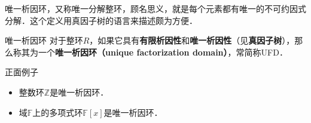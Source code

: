 


唯一析因环，又称唯一分解整环，顾名思义，就是每个元素都有唯一的不可约因式分解．这个定义用真因子树的语言来描述颇为方便．

\begin{definition}{唯一析因环}
对于整环$R$，如果它具有\textbf{有限析因性}和\textbf{唯一析因性}（见\textbf{真因子树}），那么称其为一个\textbf{唯一析因环（unique factorization domain）}，常简称UFD．
\end{definition}

\begin{example}{正面例子}
\begin{itemize}
\item 整数环$\mathbb{Z}$是唯一析因环．
\item 域$\mathbb{F}$上的多项式环$\mathbb{F}[x]$是唯一析因环．
\end{itemize}
\end{example}


